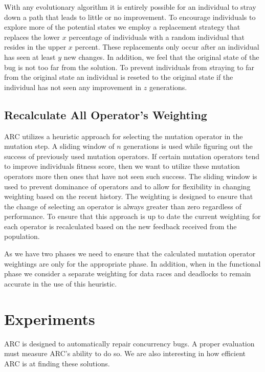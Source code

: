 \documentclass[10pt, conference, compsocconf]{IEEEtran}
\begin{document}
With any evolutionary algorithm it is entirely possible for an individual to
stray down a path that leads to little or no improvement. To encourage
individuals to explore more of the potential states we employ a replacement
strategy that replaces the lower $x$ percentage of individuals with a random
individual that resides in the upper $x$ percent.  These replacements only
occur after an individual has seen at least $y$ new changes. In addition, we
feel that the original state of the bug is not too far from the solution. To
prevent individuals from straying to far from the original state an individual
is reseted to the original state if the individual has not seen any improvement
in $z$ generations.

\subsection{Recalculate All Operator's Weighting}
\label{sec:recalculate_operator_weighting}

ARC utilizes a heuristic approach for selecting the mutation operator in the
mutation step. A sliding window of $n$ generations is used while figuring out
the success of previously used mutation operators. If certain mutation
operators tend to improve individuals fitness score, then we want to utilize
these mutation operators more then ones that have not seen such success. The
sliding window is used to prevent dominance of operators and to allow for
flexibility in changing weighting based on the recent history. The weighting is
designed to ensure that the change of selecting an operator is always greater
than zero regardless of performance. To ensure that this approach is up to date
the current weighting for each operator is recalculated based on the new
feedback received from the population.

As we have two phases we need to ensure that the calculated mutation operator
weightings are only for the appropriate phase. In addition, when in the
functional phase we consider a separate weighting for data races and deadlocks
to remain accurate in the use of this heuristic.

\section{Experiments}
\label{sec:experiments}

ARC is designed to automatically repair concurrency bugs. A proper
evaluation must measure ARC's ability to do so. We are also interesting in how
efficient ARC is at finding these solutions.
\end{document}
